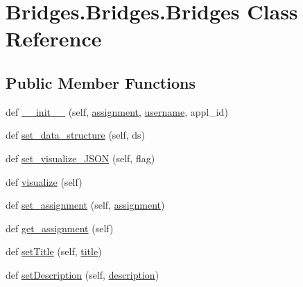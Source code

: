 \hypertarget{class_bridges_1_1_bridges_1_1_bridges}{}\section{Bridges.\+Bridges.\+Bridges Class Reference}
\label{class_bridges_1_1_bridges_1_1_bridges}
\subsection*{Public Member Functions}
\begin{DoxyCompactItemize}
\item 
def \mbox{\hyperlink{class_bridges_1_1_bridges_1_1_bridges_ada234978079456870bf2212eaa1be938}{\+\_\+\+\_\+init\+\_\+\+\_\+}} (self, \mbox{\hyperlink{class_bridges_1_1_bridges_1_1_bridges_a33719976eb816d13f632e9342d31b718}{assignment}}, \mbox{\hyperlink{class_bridges_1_1_bridges_1_1_bridges_a4b2e284c3e910633af57a02fe73cc714}{username}}, appl\+\_\+id)
\item 
def \mbox{\hyperlink{class_bridges_1_1_bridges_1_1_bridges_a2eb292b292544a6d8ff6bb336580f133}{set\+\_\+data\+\_\+structure}} (self, ds)
\item 
def \mbox{\hyperlink{class_bridges_1_1_bridges_1_1_bridges_ab7fb96498ecd5ae918ff9d1a8b345940}{set\+\_\+visualize\+\_\+\+J\+S\+ON}} (self, flag)
\item 
def \mbox{\hyperlink{class_bridges_1_1_bridges_1_1_bridges_a7503d1902eee682a0661271c070978c1}{visualize}} (self)
\item 
def \mbox{\hyperlink{class_bridges_1_1_bridges_1_1_bridges_aee298de8362388c9aa7d4b95f16199d7}{set\+\_\+assignment}} (self, \mbox{\hyperlink{class_bridges_1_1_bridges_1_1_bridges_a33719976eb816d13f632e9342d31b718}{assignment}})
\item 
def \mbox{\hyperlink{class_bridges_1_1_bridges_1_1_bridges_a3c127f51ab4a4243c8a4893fa358f72f}{get\+\_\+assignment}} (self)
\item 
def \mbox{\hyperlink{class_bridges_1_1_bridges_1_1_bridges_ab72d30d944cb57f8a5343143cc030dc2}{set\+Title}} (self, \mbox{\hyperlink{class_bridges_1_1_bridges_1_1_bridges_a977ab3147c2a675bfd78dd199a9644ec}{title}})
\item 
def \mbox{\hyperlink{class_bridges_1_1_bridges_1_1_bridges_aa0a396dc490f1626608d9538822af1c1}{set\+Description}} (self, \mbox{\hyperlink{class_bridges_1_1_bridges_1_1_bridges_a11a96ac7da5095bbbe357c67521660b5}{description}})
\end{DoxyCompactItemize}
